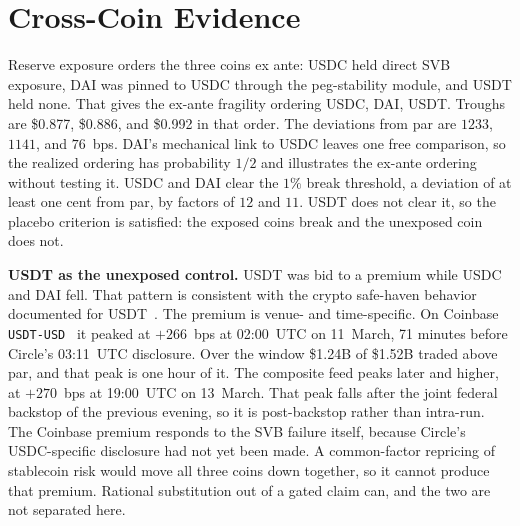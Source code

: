 \section{Cross-Coin Evidence}
\label{sec:placebo}

Reserve exposure orders the three coins ex ante: USDC held direct SVB exposure, DAI was
pinned to USDC through the peg-stability module, and USDT held none. That gives
the ex-ante fragility ordering USDC, DAI, USDT. Troughs are \$0.877, \$0.886, and
\$0.992 in that order. The deviations from par are $1233$, $1141$, and $76$~bps.
DAI's mechanical link to USDC leaves one free
comparison, so the realized ordering has probability $1/2$ and illustrates the ex-ante
ordering without testing it. USDC and DAI clear the $1\%$
break threshold, a deviation of at least one cent from par, by factors of
$12$ and $11$. USDT does not clear it, so the placebo criterion is satisfied: the
exposed coins break and the unexposed coin does not.

\noindent\textbf{USDT as the unexposed control.} USDT was bid to a premium while USDC and
DAI fell. That pattern is consistent with the crypto safe-haven behavior documented for
USDT~\cite{Baur_2021}. The premium is venue- and time-specific. On Coinbase
\texttt{USDT-USD}~\cite{coinbase2026exchangeapi} it peaked at $+266$~bps at 02:00~UTC on
11~March, 71 minutes before
Circle's 03:11~UTC disclosure. Over the window \$1.24B of \$1.52B traded above par, and
that peak is one hour of it. The composite feed peaks later and higher, at $+270$~bps at
19:00~UTC on 13~March. That peak falls after the joint federal backstop of the previous
evening, so it is post-backstop rather than intra-run. The
Coinbase premium responds to the SVB failure itself, because Circle's
USDC-specific disclosure had not yet been made. A
common-factor repricing of stablecoin risk would move all three coins down
together, so it cannot produce that premium. Rational substitution out of a gated
claim can, and the two are not separated here.
